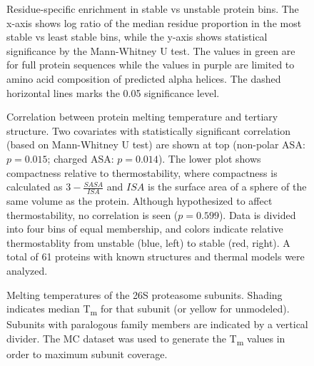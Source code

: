 \documentclass[11pt,letter]{article}\usepackage[]{graphicx}\usepackage[]{color}
\newcommand{\Tm}{T\textsubscript{m}}
\begin{document}

\begin{figure}\centering

\caption{Residue-specific enrichment in stable vs unstable protein bins. The
x-axis shows log ratio of the median residue proportion in the most stable vs
least stable bins, while the y-axis shows statistical significance by the
Mann-Whitney U test. The values in green are for full protein sequences while
the values in purple are limited to amino acid composition of predicted alpha
helices. The dashed horizontal lines marks the 0.05 significance level.} 

\label{fig:aa_enrich}
\end{figure}


\begin{figure}\centering

\caption{Correlation between protein melting temperature and tertiary
structure. Two covariates with statistically significant correlation (based on
Mann-Whitney U test) are shown at top (non-polar ASA:
$p=0.015$; charged ASA: $p=0.014$).
The lower plot shows compactness relative to thermostability, where
compactness is calculated as $3-\frac{SASA}{ISA}$ and $ISA$ is the surface
area of a sphere of the same volume as the protein. Although hypothesized to
affect thermostability, no correlation is seen
($p=0.599$). Data is divided into four bins of equal
membership, and colors indicate relative thermostablity from unstable (blue,
left) to stable (red, right). A total of 61 proteins
with known structures and thermal models were analyzed.} 

\label{fig:tertiary}
\end{figure}


\begin{figure}\centering

\caption{Melting temperatures of the 26S proteasome subunits. Shading
indicates median \Tm{} for that subunit (or yellow for unmodeled). Subunits
with paralogous family members are indicated by a vertical divider. The MC
dataset was used to generate the \Tm{} values in order to maximum subunit
coverage.}

\label{fig:proteasome}
\end{figure}
\end{document}
